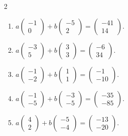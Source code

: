 \begin{multicols}{2}
\begin{enumerate}[label=\arabic*.,  leftmargin=*]
\item $a\begin{pmatrix} -1 \\ 0 \end{pmatrix} + b\begin{pmatrix} -5 \\ 2 \end{pmatrix} = \begin{pmatrix} -41 \\ 14 \end{pmatrix}$.
\item $a\begin{pmatrix} -3 \\ 5 \end{pmatrix} + b\begin{pmatrix} 3 \\ 3 \end{pmatrix} = \begin{pmatrix} -6 \\ 34 \end{pmatrix}$.
\item $a\begin{pmatrix} -1 \\ -2 \end{pmatrix} + b\begin{pmatrix} 1\\ 1 \end{pmatrix} = \begin{pmatrix} -1 \\ -10 \end{pmatrix}$.
\item $a\begin{pmatrix} -1 \\ -5 \end{pmatrix} + b\begin{pmatrix} -3 \\ -5 \end{pmatrix} = \begin{pmatrix} -35 \\ -85 \end{pmatrix}$.
\item $a\begin{pmatrix} 4 \\ 2 \end{pmatrix} + b\begin{pmatrix} -5 \\ -4 \end{pmatrix} = \begin{pmatrix} -13 \\ -20 \end{pmatrix}$.
\end{enumerate}
\end{multicols}

